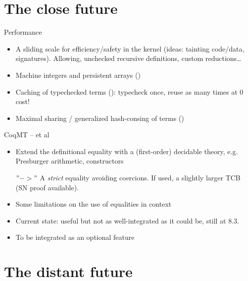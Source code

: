 \section{The close future}

\begin{subsecframe}{Performance}

  \begin{itemize}
  \item A sliding scale for efficiency/safety in the kernel (ideas:
    tainting code/data, signatures). Allowing, unchecked recursive
    definitions, custom reductions\dots
  \item Machine integers and persistent arrays ()
  \item Caching of typechecked terms ():
    typecheck once, reuse as many times at 0 cost!
  \item Maximal sharing / generalized hash-consing of terms ()
  \end{itemize}
  
\end{subsecframe}

\begin{subsecframe}{CoqMT --  et al}
  \begin{itemize}
  \item Extend the definitional equality with a (first-order) decidable
    theory, e.g. Presburger arithmetic, constructors
  \item[$"->"$] A \emph{strict} equality avoiding coercions.
    If used, a slightly larger TCB (SN proof available).
  \item Some limitations on the use of equalities in context
  \item Current state: useful but not as well-integrated as it could
    be, still at 8.3.
  \item To be integrated as an optional feature
  \end{itemize}
\end{subsecframe}  

\section{The distant future}

